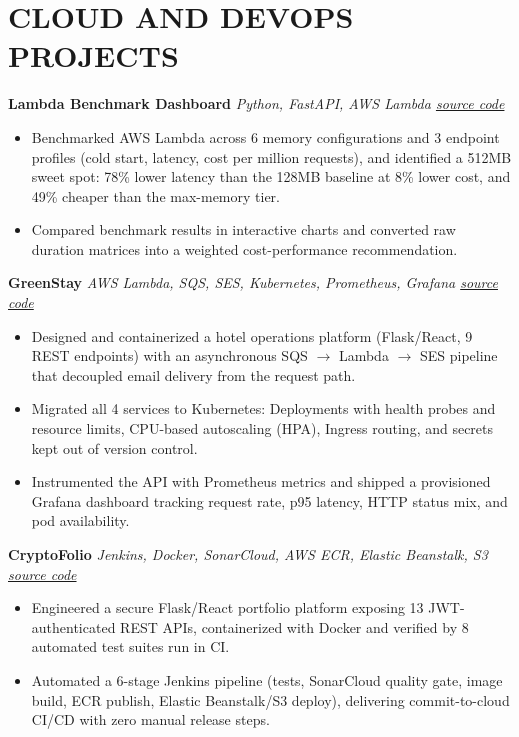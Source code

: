 \documentclass[10pt,a4paper]{article}
\newcommand{\project}[2]{%
  \textbf{#1} \textcolor{rulegray}{\textbar{}} \textit{#2}%
}
\begin{document}
\section{CLOUD AND DEVOPS PROJECTS}
\project{Lambda Benchmark Dashboard}{Python, FastAPI, AWS Lambda \textcolor{rulegray}{\textbar{}} \href{https://github.com/AftabMulani11/lambda-benchmark-dashboard}{\textcolor{brandblue}{source code}}}
\begin{itemize}
  \item Benchmarked AWS Lambda across 6 memory configurations and 3 endpoint profiles (cold start, latency, cost per million requests), and identified a 512MB sweet spot: 78\% lower latency than the 128MB baseline at 8\% lower cost, and 49\% cheaper than the max-memory tier.
  \item Compared benchmark results in interactive charts and converted raw duration matrices into a weighted cost-performance recommendation.
\end{itemize}

\project{GreenStay}{AWS Lambda, SQS, SES, Kubernetes, Prometheus, Grafana \textcolor{rulegray}{\textbar{}} \href{https://github.com/AftabMulani11/greenstay}{\textcolor{brandblue}{source code}}}
\begin{itemize}
  \item Designed and containerized a hotel operations platform (Flask/React, 9 REST endpoints) with an asynchronous SQS \(\to\) Lambda \(\to\) SES pipeline that decoupled email delivery from the request path.
  \item Migrated all 4 services to Kubernetes: Deployments with health probes and resource limits, CPU-based autoscaling (HPA), Ingress routing, and secrets kept out of version control.
  \item Instrumented the API with Prometheus metrics and shipped a provisioned Grafana dashboard tracking request rate, p95 latency, HTTP status mix, and pod availability.
\end{itemize}

\project{CryptoFolio}{Jenkins, Docker, SonarCloud, AWS ECR, Elastic Beanstalk, S3 \textcolor{rulegray}{\textbar{}} \href{https://github.com/AftabMulani11/cryptofolio}{\textcolor{brandblue}{source code}}}
\begin{itemize}
  \item Engineered a secure Flask/React portfolio platform exposing 13 JWT-authenticated REST APIs, containerized with Docker and verified by 8 automated test suites run in CI.
  \item Automated a 6-stage Jenkins pipeline (tests, SonarCloud quality gate, image build, ECR publish, Elastic Beanstalk/S3 deploy), delivering commit-to-cloud CI/CD with zero manual release steps.
\end{itemize}
\end{document}

